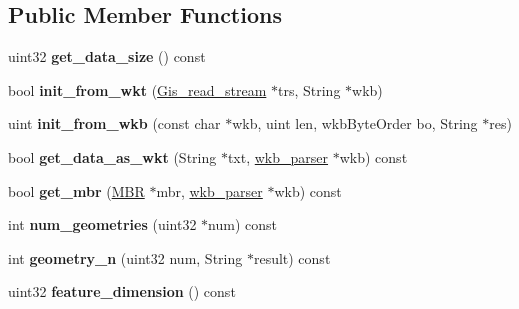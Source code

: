 \subsection*{Public Member Functions}
\begin{DoxyCompactItemize}
\item 
\mbox{\label{classGis__multi__polygon_a673a1ac0af60cacc1132185596c82482}} 
uint32 {\bfseries get\+\_\+data\+\_\+size} () const
\item 
\mbox{\label{classGis__multi__polygon_a7d64f500547ddd0dfd94008acff65dfa}} 
bool {\bfseries init\+\_\+from\+\_\+wkt} (\mbox{\hyperlink{classGis__read__stream}{Gis\+\_\+read\+\_\+stream}} $\ast$trs, String $\ast$wkb)
\item 
\mbox{\label{classGis__multi__polygon_a345b11ae03652500488874e8cdeaffe7}} 
uint {\bfseries init\+\_\+from\+\_\+wkb} (const char $\ast$wkb, uint len, wkb\+Byte\+Order bo, String $\ast$res)
\item 
\mbox{\label{classGis__multi__polygon_a4427b52a748783db0c961dedb237820d}} 
bool {\bfseries get\+\_\+data\+\_\+as\+\_\+wkt} (String $\ast$txt, \mbox{\hyperlink{classGeometry_1_1wkb__parser}{wkb\+\_\+parser}} $\ast$wkb) const
\item 
\mbox{\label{classGis__multi__polygon_af1539964ca7aec8eb2414d32c8810a60}} 
bool {\bfseries get\+\_\+mbr} (\mbox{\hyperlink{structMBR}{M\+BR}} $\ast$mbr, \mbox{\hyperlink{classGeometry_1_1wkb__parser}{wkb\+\_\+parser}} $\ast$wkb) const
\item 
\mbox{\label{classGis__multi__polygon_a711d173a96f360e8c39965b4d1571e4a}} 
int {\bfseries num\+\_\+geometries} (uint32 $\ast$num) const
\item 
\mbox{\label{classGis__multi__polygon_a8285a25e4ce2e4f9a7e4607816a77bde}} 
int {\bfseries geometry\+\_\+n} (uint32 num, String $\ast$result) const
\item 
\mbox{\label{classGis__multi__polygon_a07b14b4b3ccb7a84f5cc3e409f4ebc2d}} 
uint32 {\bfseries feature\+\_\+dimension} () const

\end{DoxyCompactItemize}
